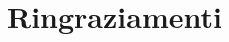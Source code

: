 \chapter*{Ringraziamenti}

\newpage
\null
\newpage

\newpage
\null
\newpage

\newpage
\null
\newpage